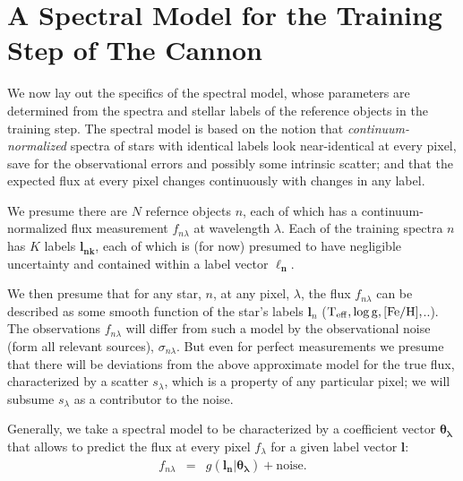 \documentclass[12pt, preprint]{aastex}
\newcommand{\set}[1]{\bm{#1}}
\newcommand{\teff}{\mbox{$\rm T_{eff}$}}
\newcommand{\feh}{\mbox{$\rm [Fe/H]$}}
\newcommand{\logg}{\mbox{$\rm \log g$}}
\newcommand{\noise}{\sigma_{n\lambda}}
\newcommand{\scatter}{s_{\lambda}}
\begin{document}
\section{A Spectral Model for the Training Step of The Cannon}
\label{sec:spectralmodel}

We now lay out the specifics of the spectral model, whose parameters are determined 
from the spectra and stellar labels of the reference objects in the training step.
The spectral model is based on the notion that \textit{continuum-normalized} spectra of
stars with identical labels look near-identical at every pixel, save for the observational errors
and possibly some intrinsic scatter; and that the expected  flux at every pixel changes continuously
with changes in any label.

We presume there are $N$ refernce objects $n$, each of which has
a continuum-normalized flux measurement $f_{n\lambda}$ at wavelength
$\lambda$. Each of the training spectra $n$ has $K$ labels $\boldsymbol{l_{nk}}$, each of which
is (for now) presumed to have negligible uncertainty and contained within a label vector $\boldsymbol{\ell_n}$.

We then presume that for any star, $n$, at any pixel, $\lambda$,
the flux $f_{n\lambda}$  can be described as some smooth function of the star's labels $\set{l}_n$
($\teff,\logg,\feh,$..). The observations $f_{n\lambda}$ will differ from such a model by the observational noise (form all relevant sources), $\noise$. But even for perfect measurements we presume that there will be
deviations from the above approximate model for the true flux, characterized by a scatter $\scatter$,
which is a property of any particular pixel; we will subsume $\scatter$ as a contributor to the noise.


Generally, we take a spectral model to be characterized by a coefficient vector $\boldsymbol{\theta_\lambda}$
that allows to predict the flux at every pixel $f_\lambda$ for a given label vector 
$\boldsymbol{l}$:  
\begin{eqnarray}
f_{n\lambda} &=&
g(\boldsymbol{l_n} |  \boldsymbol{\theta_\lambda}) + \mbox{noise}.
 \label{eq:specmodel}
\end{eqnarray}
\end{document}
